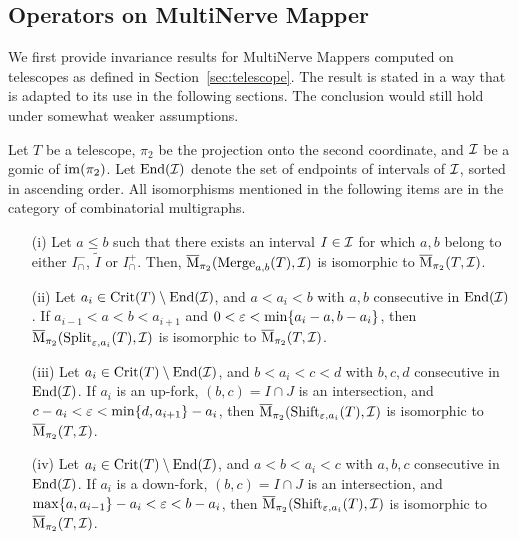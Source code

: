 \subsection{Operators on MultiNerve Mapper}
\label{sec:opeMulti}

We first provide invariance results for MultiNerve Mappers computed on telescopes as defined in Section~\ref{sec:telescope}. 
The result is stated in a way that is adapted to its use in the following
sections. The conclusion would still hold under somewhat weaker
assumptions.
%
\begin{prop}\label{prop:MNInv}
Let $T$ be a telescope, $\pi_2$ be the projection onto the second coordinate, and $\mathcal{I}$ be a gomic of $\mathrm{im}(\pi_2)$.
Let $\mathrm{End}(\mathcal{I})$ denote the set of endpoints of intervals of $\mathcal{I}$, sorted in ascending order.
All isomorphisms mentioned in the following items are in the category of combinatorial multigraphs.

\begin{itemize}
\setlength{\itemsep}{0.2pt}
\item[\rm (i)] Let $a\leq b$ such that there exists an interval $I\in\mathcal{I}$ for which $a,b$ belong to 
either $I_\cap^-$, $\tilde I$ or $I_\cap^+$.
Then, $\overline{\mathrm{M}}_{\pi_2}(\mathrm{Merge}_{a,b}(T),\mathcal{I})$ is isomorphic to $\overline{\mathrm{M}}_{\pi_2}(T,\mathcal{I})$.
 
\item[{\rm (ii)}] Let $a_i\in\mathrm{Crit}(T)\setminus \mathrm{End}(\mathcal{I})$, and
$a<a_i<b$ with $a,b$ consecutive in $\mathrm{End}(\mathcal{I})$.  If
$a_{i-1}<a<b<a_{i+1}$ and $0<\varepsilon<\min\{a_i-a, b-a_i\}$, then
$\overline{\mathrm{M}}_{\pi_2}(\mathrm{Split}_{\varepsilon,a_i}(T),\mathcal{I})$ is isomorphic to $\overline{\mathrm{M}}_{\pi_2}(T,\mathcal{I})$.

\item[{\rm (iii)}] Let $a_i\in\mathrm{Crit}(T)\setminus \mathrm{End}(\mathcal{I})$, and $b<a_i<c<d$ with $b,c,d$ consecutive in $\mathrm{End}(\mathcal{I})$.
If $a_i$ is an up-fork, $(b,c)=I \cap J$ is an intersection, and 
$c-a_i< \varepsilon< \min\{d, a_{i+1}\} - a_i$, then $\overline{\mathrm{M}}_{\pi_2}(\mathrm{Shift}_{\varepsilon,a_i}(T),\mathcal{I})$ is isomorphic to $\overline{\mathrm{M}}_{\pi_2}(T,\mathcal{I})$. 

\item[{\rm (iv)}] Let $a_i\in\mathrm{Crit}(T)\setminus \mathrm{End}(\mathcal{I})$, and $a<b<a_i<c$ with $a,b,c$ consecutive in $\mathrm{End}(\mathcal{I})$.
If $a_i$ is a down-fork, $(b,c)=I\cap J$ is an intersection, 
and $\max\{a, a_{i-1}\} - a_i<\varepsilon<b-a_i$, then
$\overline{\mathrm{M}}_{\pi_2}(\mathrm{Shift}_{\varepsilon,a_i}(T),\mathcal{I})$ is isomorphic to
$\overline{\mathrm{M}}_{\pi_2}(T,\mathcal{I})$.

\end{itemize}
%
\end{prop}

